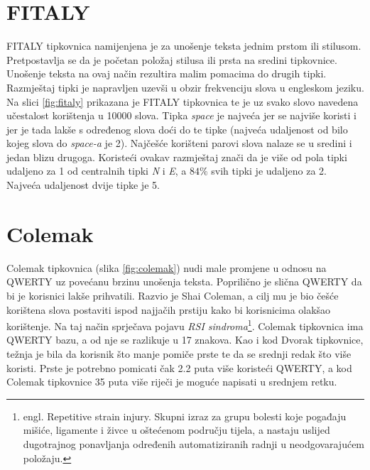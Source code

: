 \documentclass[times, utf8, zavrsni]{fer}
\begin{document}
\section{FITALY}
FITALY tipkovnica namijenjena je za unošenje teksta jednim prstom ili stilusom. Pretpostavlja se da je početan položaj stilusa ili prsta na sredini tipkovnice. Unošenje teksta na ovaj način rezultira malim pomacima do drugih tipki. Razmještaj tipki je napravljen uzevši u obzir frekvenciju slova u engleskom jeziku. Na slici \ref{fig:fitaly} prikazana je FITALY tipkovnica te je uz svako slovo navedena učestalost korištenja u 10000 slova. Tipka \emph{space} je najveća jer se najviše koristi i jer je tada lakše s određenog slova doći do te tipke (najveća udaljenost od bilo kojeg slova do \emph{space-a} je 2). Najčešće korišteni parovi slova nalaze se u sredini i jedan blizu drugoga. Koristeći ovakav razmještaj znači da je više od pola tipki udaljeno za 1 od centralnih tipki \emph{N} i \emph{E}, a $84\%$ svih tipki je udaljeno za 2. Najveća udaljenost dvije tipke je 5.

\section{Colemak}
Colemak tipkovnica (slika \ref{fig:colemak}) nudi male promjene u odnosu na QWERTY uz povećanu brzinu unošenja teksta. Poprilično je slična QWERTY da bi je korisnici lakše prihvatili. Razvio je Shai Coleman, a cilj mu je bio češće korištena slova postaviti ispod najjačih prstiju kako bi korisnicima olakšao korištenje. Na taj način sprječava pojavu \emph{RSI sindroma}\footnote{engl. Repetitive strain injury. Skupni izraz za grupu bolesti koje pogađaju mišiće, ligamente i živce u oštećenom području tijela, a nastaju uslijed dugotrajnog ponavljanja određenih automatiziranih radnji u neodgovarajućem položaju.}. Colemak tipkovnica ima QWERTY bazu, a od nje se razlikuje u 17 znakova. Kao i kod Dvorak tipkovnice, težnja je bila da korisnik što manje pomiče prste te da se srednji redak što više koristi. Prste je potrebno pomicati čak 2.2 puta više koristeći QWERTY, a kod Colemak tipkovnice 35 puta više riječi je moguće napisati u srednjem retku.
\end{document}
